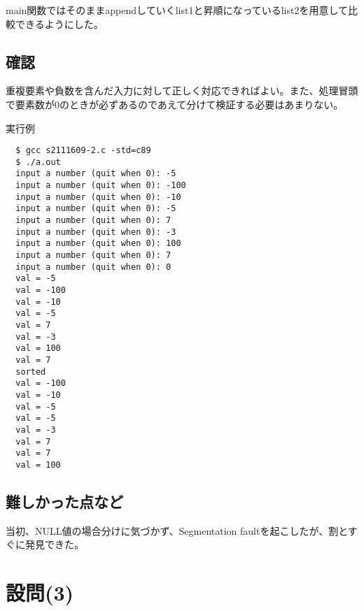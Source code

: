 \documentclass[dvipdfmx,12pt,a4j]{jarticle}
\begin{document}
main関数ではそのままappendしていくlist1と昇順になっているlist2を用意して比較できるようにした。




\subsection{確認}
重複要素や負数を含んだ入力に対して正しく対応できればよい。また、処理冒頭で要素数が0のときが必ずあるのであえて分けて検証する必要はあまりない。

\begin{itembox}[l]{実行例}
\begin{verbatim}
  $ gcc s2111609-2.c -std=c89
  $ ./a.out
  input a number (quit when 0): -5
  input a number (quit when 0): -100
  input a number (quit when 0): -10
  input a number (quit when 0): -5
  input a number (quit when 0): 7
  input a number (quit when 0): -3
  input a number (quit when 0): 100
  input a number (quit when 0): 7
  input a number (quit when 0): 0
  val = -5
  val = -100
  val = -10
  val = -5
  val = 7
  val = -3
  val = 100
  val = 7
  sorted
  val = -100
  val = -10
  val = -5
  val = -5
  val = -3
  val = 7
  val = 7
  val = 100
\end{verbatim}
\end{itembox}

\subsection{難しかった点など}
当初、NULL値の場合分けに気づかず、Segmentation faultを起こしたが、割とすぐに発見できた。


\section{設問(3)}


























\end{document}
